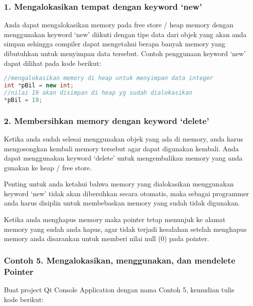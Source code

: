 \subsubsection{\texorpdfstring{1. Mengalokasikan tempat dengan keyword
`new'}{Mengalokasikan tempat dengan keyword new}}\label{mengalokasikan-tempat-dengan-keyword-new}

Anda dapat mengalokasikan memory pada free store / heap memory dengan
menggunakan keyword `new' diikuti dengan tipe data dari objek yang akan
anda simpan sehingga compiler dapat mengetahui berapa banyak memory yang
dibutuhkan untuk menyimpan data tersebut. Contoh penggunaan keyword
`new' dapat dilihat pada kode berikut:

\begin{lstlisting}[language=c++]
//mengalokasikan memory di heap untuk menyimpan data integer
int *pBil = new int;
//nilai 19 akan disimpan di heap yg sudah dialokasikan
*pBil = 19;
\end{lstlisting}

\subsubsection{\texorpdfstring{2. Membersihkan memory dengan keyword
`delete'}{Membersihkan memory dengan keyword delete}}\label{membersihkan-memory-dengan-keyword-delete}

Ketika anda sudah selesai menggunakan objek yang ada di memory, anda
harus mengosongkan kembali memory tersebut agar dapat digunakan kembali.
Anda dapat menggunakan keyword `delete' untuk mengembalikan memory yang
anda gunakan ke heap / free store.

Penting untuk anda ketahui bahwa memory yang dialokasikan menggunakan
keyword `new' tidak akan dibersihkan secara otomatis, maka sebagai
programmer anda harus disiplin untuk membebaskan memory yang sudah tidak
digunakan.

Ketika anda menghapus memory maka pointer tetap menunjuk ke alamat
memory yang sudah anda hapus, agar tidak terjadi kesalahan setelah
menghapus memory anda disarankan untuk memberi nilai null (0) pada
pointer.

\subsubsection*{Contoh 5. Mengalokasikan, menggunakan, dan mendelete Pointer}

Buat project Qt Console Application dengan nama Contoh 5, kemudian tulis
kode berikut:

